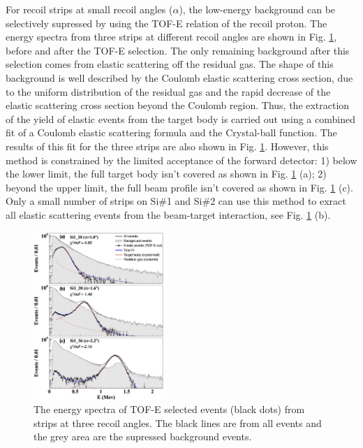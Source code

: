\documentclass[fleqn,twocolumn,a4paper]{ikpar}
\begin{document}
For recoil strips at small recoil angles ($\alpha$), the low-energy background
can be selectively supressed by using the TOF-E relation of the recoil proton.
The energy spectra from three strips at different recoil angles are shown in
Fig. \ref{fig:coulomb_cb2_fit},  before and after the TOF-E selection.
The only remaining background after this selection comes from elastic scattering off the residual gas.
The shape of this background is well described by the Coulomb elastic scattering cross
section, due to the uniform distribution of the residual gas \cite{r2} and the
rapid decrease of the elastic scattering cross section beyond the Coulomb region.
Thus, the extraction of the yield of elastic events from the target body is carried out
using a combined fit of a Coulomb elastic scattering formula and the Crystal-ball
function.
The results of this fit for the three strips are also shown in Fig. \ref{fig:coulomb_cb2_fit}.
However, this method is constrained by the limited acceptance of the forward detector:
1) below the lower limit, the full target body isn't covered as shown in Fig.
\ref{fig:coulomb_cb2_fit} (a);
2) beyond the upper limit, the full beam profile isn't covered as shown in
Fig. \ref{fig:coulomb_cb2_fit} (c).
Only a small number of strips on Si\#1 and Si\#2 can use this method to exract all
elastic scattering events from the beam-target interaction, see Fig. \ref{fig:coulomb_cb2_fit} (b).
\begin{figure}[!htb]
	\includegraphics[width=0.45\textwidth]{./coulomb_cb2_fit.png}
  \caption{The energy spectra of TOF-E selected events (black dots) from strips at three
    recoil angles. The black lines are from all events and the grey area are the
  supressed background events. }
  \label{fig:coulomb_cb2_fit}
\end{figure}
\end{document}
